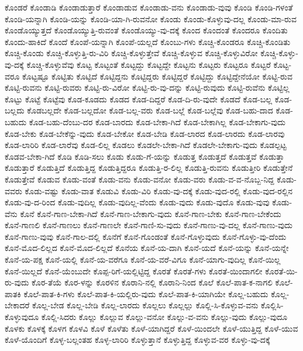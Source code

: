 {ಕೊಂಡರೆ
ಕೊಂಡಾಡಿ
ಕೊಂಡಾಡುತ್ತಾರೆ
ಕೊಂಡಾಡುವ
ಕೊಂಡಾಡು-ವನು
ಕೊಂಡಾಡು-ವುವು
ಕೊಂಡಿ
ಕೊಂಡಿ-ಗಳಂತೆ
ಕೊಂಡಿ-ಯನ್ನಾಗಿ
ಕೊಂಡಿ-ಯನ್ನು
ಕೊಂಡಿ-ಯಾ-ಗಿ-ರುವನೋ
ಕೊಂಡು
ಕೊಂಡು-ಕೊಳ್ಳುವು-ದಲ್ಲ
ಕೊಂಡು-ಮಾ-ರುವ
ಕೊಂಡೊಯ್ಯುತ್ತದೆ
ಕೊಂಡೊಯ್ಯುತ್ತಿ-ರುವಂತೆ
ಕೊಂಡೊಯ್ಯು-ವು-ದಕ್ಕೆ
ಕೊಂದ
ಕೊಂದಂತೆ
ಕೊಂದರೂ
ಕೊಂದಿತು
ಕೊಂದು-ಹಾಕಿದೆ
ಕೊಂದೆ
ಕೊಂಪೆ-ಯನ್ನಾಗಿ
ಕೊಂಪೆ-ಯಲ್ಲದೆ
ಕೊಂಬು-ಗಳು
ಕೊಚ್ಚಿ-ಕೊಂಡರೂ
ಕೊಚ್ಚಿ-ಕೊಂಡಿತು
ಕೊಚ್ಚಿ-ಕೊಂಡು
ಕೊಚ್ಚಿ-ಕೊಳ್ಳುತ್ತಿ-ರು-ವಿರಿ
ಕೊಚ್ಚಿ-ಕೊಳ್ಳುತ್ತೇವೆ
ಕೊಚ್ಚಿ-ಕೊಳ್ಳುವ
ಕೊಚ್ಚಿ-ಕೊಳ್ಳುವಿರೋ
ಕೊಚ್ಚಿ-ಕೊಳ್ಳು-ವು-ದಕ್ಕೆ
ಕೊಚ್ಚಿ-ಕೊಳ್ಳುವೆವು
ಕೊಟ್ಟ
ಕೊಟ್ಟಂತೆ
ಕೊಟ್ಟದ್ದು
ಕೊಟ್ಟದ್ದೇ
ಕೊಟ್ಟನು
ಕೊಟ್ಟರು
ಕೊಟ್ಟರೂ
ಕೊಟ್ಟರೆ
ಕೊಟ್ಟ-ವರೂ
ಕೊಟ್ಟಷ್ಟೂ
ಕೊಟ್ಟಿತು
ಕೊಟ್ಟಿದೆ
ಕೊಟ್ಟಿದ್ದನು
ಕೊಟ್ಟಿದ್ದರು
ಕೊಟ್ಟಿದ್ದರೆ
ಕೊಟ್ಟಿದ್ದು
ಕೊಟ್ಟಿದ್ದೇನೆಯೋ
ಕೊಟ್ಟಿ-ರುವ
ಕೊಟ್ಟಿ-ರುವನು
ಕೊಟ್ಟಿ-ರುವರು
ಕೊಟ್ಟಿ-ರು-ವಿರೋ
ಕೊಟ್ಟಿ-ರು-ವು-ದನ್ನು
ಕೊಟ್ಟಿ-ರುವುದು
ಕೊಟ್ಟಿ-ರುವೆನು
ಕೊಟ್ಟಿಲ್ಲ
ಕೊಟ್ಟು
ಕೊಟ್ಟೆ
ಕೊಟ್ಟೆವು
ಕೊಡ-ಕೂಡದು
ಕೊಡದ
ಕೊಡ-ದಿದ್ದರೆ
ಕೊಡ-ದಿ-ರು-ವುದೇ
ಕೊಡದೆ
ಕೊಡ-ಬಲ್ಲ
ಕೊಡ-ಬಲ್ಲದು
ಕೊಡಬಲ್ಲದೇ
ಕೊಡ-ಬಲ್ಲದೋ
ಕೊಡ-ಬಲ್ಲ-ವರು
ಕೊಡ-ಬಲ್ಲೆ
ಕೊಡ-ಬಲ್ಲೆವು
ಕೊಡ-ಬಹು-ದಾದ
ಕೊಡ-ಬಹುದು
ಕೊಡ-ಬಹು-ದೆಂಬು-ದರ
ಕೊಡ-ಬಾರದು
ಕೊಡ-ಬೇಕಾ-ಗಿದೆ
ಕೊಡ-ಬೇಕಾಗಿಲ್ಲ
ಕೊಡ-ಬೇಕಾಗು-ವುದು
ಕೊಡ-ಬೇಕು
ಕೊಡ-ಬೇಕೆನ್ನು-ವುದು
ಕೊಡ-ಬೇಕೋ
ಕೊಡ-ಬೇಡಿ
ಕೊಡ-ಲಾರದ
ಕೊಡ-ಲಾರದು
ಕೊಡ-ಲಾರವು
ಕೊಡ-ಲಾರಿರಿ
ಕೊಡ-ಲಾರೆವು
ಕೊಡ-ಲಿಲ್ಲ
ಕೊಡಲು
ಕೊಡಲೇ-ಬೇಕಾ-ಗಿದೆ
ಕೊಡಲೇ-ಬೇಕಾಗು-ವುದು
ಕೊಡಲ್ಪಟ್ಟ
ಕೊಡವ-ಬೇಕಾ-ಗಿದೆ
ಕೊಡಿ
ಕೊಡಿ-ಸಲು
ಕೊಡು
ಕೊಡು-ಗೆ-ಯನ್ನು
ಕೊಡುತ್ತ
ಕೊಡುತ್ತದೆ
ಕೊಡುತ್ತವೆ
ಕೊಡುತ್ತಾ
ಕೊಡುತ್ತಾರೆ
ಕೊಡುತ್ತಿದೆ
ಕೊಡುತ್ತಿದ್ದ
ಕೊಡುತ್ತಿದ್ದರೂ
ಕೊಡುತ್ತಿ-ರ-ಲಿಲ್ಲ
ಕೊಡುತ್ತಿ-ರುವನು
ಕೊಡುತ್ತೀರಿ
ಕೊಡುತ್ತೇನೆ
ಕೊಡುತ್ತೇವೆ
ಕೊಡುವ
ಕೊಡು-ವಂತೆ
ಕೊಡು-ವನು
ಕೊಡು-ವನೋ
ಕೊಡು-ವರು
ಕೊಡು-ವ-ವ-ನೊಬ್ಬ-ನಿದ್ದ
ಕೊಡು-ವವರು
ಕೊಡು-ವಷ್ಟು
ಕೊಡು-ವಾತ
ಕೊಡುವಿ
ಕೊಡು-ವಿರಿ
ಕೊಡು-ವು-ದಕ್ಕೆ
ಕೊಡು-ವುದ-ರಲ್ಲಿ
ಕೊಡು-ವುದ-ರಲ್ಲಿನ
ಕೊಡು-ವು-ದ-ರಿಂದ
ಕೊಡು-ವುದಿಲ್ಲ
ಕೊಡು-ವುದಿಲ್ಲ-ವೆಂದು
ಕೊಡು-ವುದು
ಕೊಡು-ವುದೊ
ಕೊಡು-ವುವು
ಕೊಡು-ವೆನು
ಕೊನೆ
ಕೊನೆ-ಗಾಣ-ಬೇಕಾ-ಗಿದೆ
ಕೊನೆ-ಗಾಣ-ಬೇಕಾಗು-ವುದು
ಕೊನೆ-ಗಾಣ-ಬೇಕು
ಕೊನೆ-ಗಾಣ-ಬೇಕೆಂದು
ಕೊನೆ-ಗಾಣಲಿ
ಕೊನೆ-ಗಾಣಲು
ಕೊನೆ-ಗಾಣಲೇ
ಕೊನೆ-ಗಾಣಿ-ಸು-ವುದು
ಕೊನೆ-ಗಾಣು-ವು-ದಲ್ಲ
ಕೊನೆ-ಗಾಣು-ವುದು
ಕೊನೆ-ಗಾಣು-ವುವು
ಕೊನೆ-ಗಾಲ-ದಲ್ಲಿ
ಕೊನೆಗೆ
ಕೊನೆ-ಗೊಂಡಂತೆ
ಕೊನೆ-ಗೊಳ್ಳುವುದು
ಕೊನೆ-ಗೊಳ್ಳು-ವು-ದೆಂದು
ಕೊನೆ-ಮೊದ-ಲಿಲ್ಲದ
ಕೊನೆ-ಮೊದ-ಲಿಲ್ಲದೆ
ಕೊನೆಯ
ಕೊನೆ-ಯ-ದಾಗಿ
ಕೊನೆ-ಯದೆ
ಕೊನೆ-ಯನ್ನು
ಕೊನೆ-ಯನ್ನೇ
ಕೊನೆ-ಯ-ಪಕ್ಷ
ಕೊನೆ-ಯಲ್ಲಿ
ಕೊನೆ-ಯ-ವರೆಗೂ
ಕೊನೆ-ಯ-ವರೆ-ವಿಗೂ
ಕೊನೆ-ಯಾಗು-ವುದಿಲ್ಲ
ಕೊನೆ-ಯಿಲ್ಲ
ಕೊನೆ-ಯಿಲ್ಲದೆ
ಕೊನೆ-ಯೆಂಬುದೇ
ಕೊಪ್ಪ-ರಿಗೆ-ಯಲ್ಲಿಟ್ಟಿದ್ದ
ಕೊರತೆ
ಕೊರತೆ-ಗಳು
ಕೊರತೆ-ಯಿಂದಾಗಲೀ
ಕೊರತೆ-ಯಿ-ರು-ವುದು
ಕೊರ-ತೆಯೆ
ಕೊರ-ಳನ್ನು
ಕೊರಳಿನ
ಕೊರಾನಿ-ನಲ್ಲಿ
ಕೊರಾನಿ-ನಿಂದ
ಕೊಲೆ
ಕೊಲೆ-ಪಾತ-ಕ-ನಾಗಲಿ
ಕೊಲೆ-ಪಾತಕಿ
ಕೊಲೆ-ಪಾತ-ಕಿ-ಗಳು
ಕೊಲೆ-ಪಾತ-ಕಿ-ಯಲ್ಲಿರು-ವುದು
ಕೊಲೆ-ಪಾತ-ಕಿ-ಯಾಗಿಯೇ
ಕೊಲ್ಲ-ಬಹುದು
ಕೊಲ್ಲ-ಬೇಕಾದರೆ
ಕೊಲ್ಲ-ಬೇಡ
ಕೊಲ್ಲ-ಬೇಡಿ
ಕೊಲ್ಲ-ಲಾರದು
ಕೊಲ್ಲಲು
ಕೊಲ್ಲಲ್ಲು
ಕೊಲ್ಲಿ-ಸಿ-ಕೊಳ್ಳುವ-ವನು
ಕೊಲ್ಲಿಸಿ-ಕೊಳ್ಳುವುದೂ
ಕೊಲ್ಲಿ-ಸಿದರು
ಕೊಲ್ಲು
ಕೊಲ್ಲುವ
ಕೊಲ್ಲು-ವನೋ
ಕೊಲ್ಲು-ವ-ವನು
ಕೊಲ್ಲು-ವುದು
ಕೊಲ್ಲು-ವುದೂ
ಕೊಳಕು
ಕೊಳಕ್ಕೆ
ಕೊಳಗ
ಕೊಳವಿ
ಕೊಳೆ
ಕೊಳೆತು
ಕೊಳೆ-ಯಾಗಿದ್ದರೆ
ಕೊಳೆ-ಯಿಂದಲೇ
ಕೊಳೆ-ಯುತ್ತಿದ್ದ
ಕೊಳೆ-ಯುವ
ಕೊಳೆ-ಯೊಂದಿಗೆ
ಕೊಳ್ಳ-ಬಲ್ಲಂತಹ
ಕೊಳ್ಳ-ಲಾರಿರಿ
ಕೊಳ್ಳುತ್ತಾನೆ
ಕೊಳ್ಳುತ್ತಿದ್ದ
ಕೊಳ್ಳುವ-ವರ
ಕೊಳ್ಳು-ವು-ದಕ್ಕೆ
}

